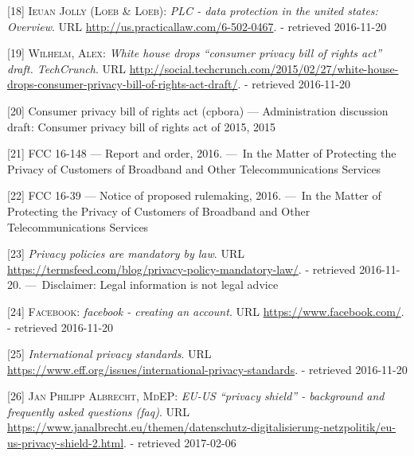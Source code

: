 \documentclass[12pt,english,a4paper,titlepage,cleardoublepage=empty,dottedtoc]{report}
\begin{document}
\hypertarget{ref-web_2016_data-protection-laws-in-the-us}{}
{[}18{]} \textsc{Ieuan Jolly (Loeb \& Loeb)}: \emph{PLC - data
protection in the united states: Overview}. URL
\url{http://us.practicallaw.com/6-502-0467}. - retrieved 2016-11-20

\hypertarget{ref-web_2015_white-house-releases-consumer-privacy-bill-draft}{}
{[}19{]} \textsc{Wilhelm, Alex}: \emph{White house drops ``consumer
privacy bill of rights act'' draft. TechCrunch}. URL
\url{http://social.techcrunch.com/2015/02/27/white-house-drops-consumer-privacy-bill-of-rights-act-draft/}.
- retrieved 2016-11-20

\hypertarget{ref-bill-draft_2015_us_consumer-privacy-bill-of-rights-act_definition}{}
{[}20{]} Consumer privacy bill of rights act (cpbora) --- Administration
discussion draft: Consumer privacy bill of rights act of 2015, 2015

\hypertarget{ref-rules_2016_fcc_to-protect-broadband-consumer-privacy_sensitive-types-of-data}{}
{[}21{]} FCC 16-148 --- Report and order, 2016. ---~In the Matter of
Protecting the Privacy of Customers of Broadband and Other
Telecommunications Services

\hypertarget{ref-rules_2016_fcc_to-protect-broadband-consumer-privacy_personally-identifiable-information}{}
{[}22{]} FCC 16-39 --- Notice of proposed rulemaking, 2016. ---~In the
Matter of Protecting the Privacy of Customers of Broadband and Other
Telecommunications Services

\hypertarget{ref-web_2016_privacy-policies-are-mandatory-by-law}{}
{[}23{]} \emph{Privacy policies are mandatory by law}. URL
\url{https://termsfeed.com/blog/privacy-policy-mandatory-law/}. -
retrieved 2016-11-20. ---~Disclaimer: Legal information is not legal
advice

\hypertarget{ref-web_2016_facebooks-landing-page_policy-acknowledgement}{}
{[}24{]} \textsc{Facebook}: \emph{facebook - creating an account}. URL
\url{https://www.facebook.com/}. - retrieved 2016-11-20

\hypertarget{ref-web_2016_international-privacy-standards}{}
{[}25{]} \emph{International privacy standards}. URL
\url{https://www.eff.org/issues/international-privacy-standards}. -
retrieved 2016-11-20

\hypertarget{ref-web_2017_privacy-shield_faq}{}
{[}26{]} \textsc{Jan Philipp Albrecht, MdEP}: \emph{EU-US ``privacy
shield'' - background and frequently asked questions (faq)}. URL
\url{https://www.janalbrecht.eu/themen/datenschutz-digitalisierung-netzpolitik/eu-us-privacy-shield-2.html}.
- retrieved 2017-02-06
\end{document}
